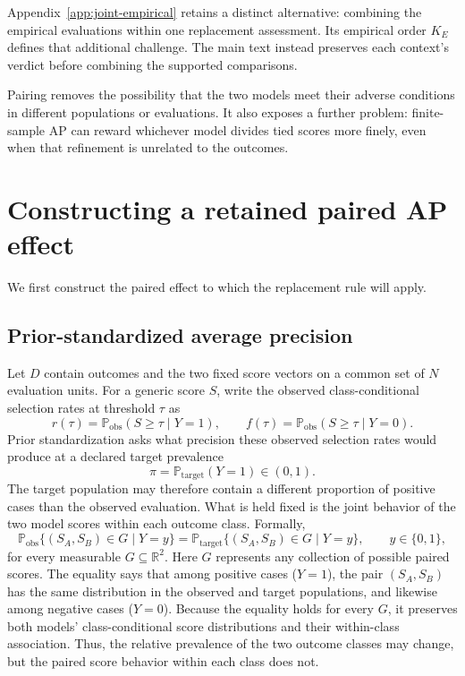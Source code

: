 \documentclass[11pt]{article}
\newcommand{\Prb}{\mathbb{P}}
\theoremstyle{remark}
\begin{document}
Appendix~\ref{app:joint-empirical} retains a distinct alternative: combining
the empirical evaluations within one replacement assessment. Its empirical
order $K_E$ defines that additional challenge. The main text instead preserves
each context's verdict before combining the supported comparisons.

Pairing removes the possibility that the two models meet their adverse
conditions in different populations or evaluations. It also exposes a further
problem: finite-sample AP can reward whichever model divides tied scores more
finely, even when that refinement is unrelated to the outcomes.

\section{Constructing a retained paired AP effect}
\label{sec:paired-effect}

We first construct the paired effect to which the replacement rule will apply.

\subsection{Prior-standardized average precision}

Let $D$ contain outcomes and the two fixed score vectors on a common set of
$N$ evaluation units. For a generic score $S$, write the observed
class-conditional selection rates at threshold $\tau$ as
\[
r(\tau)=\Prb_{\mathrm{obs}}(S\geq\tau\mid Y=1),
\qquad
f(\tau)=\Prb_{\mathrm{obs}}(S\geq\tau\mid Y=0).
\]
Prior standardization asks what precision these observed selection rates would
produce at a declared target prevalence
\[
\pi=\Prb_{\mathrm{target}}(Y=1)\in(0,1).
\]
The target population may therefore contain a different proportion of positive
cases than the observed evaluation. What is held fixed is the joint behavior
of the two model scores within each outcome class. Formally,
\begin{equation}
\Prb_{\mathrm{obs}}\{(S_A,S_B)\in G\mid Y=y\}
=
\Prb_{\mathrm{target}}\{(S_A,S_B)\in G\mid Y=y\},
\qquad y\in\{0,1\},
\label{eq:score-invariance}
\end{equation}
for every measurable $G\subseteq\mathbb R^2$. Here $G$ represents any
collection of possible paired scores. The equality says that among positive
cases ($Y=1$), the pair $(S_A,S_B)$ has the same distribution in the observed
and target populations, and likewise among negative cases ($Y=0$). Because the
equality holds for every $G$, it preserves both models' class-conditional score
distributions and their within-class association. Thus, the relative
prevalence of the two outcome classes may change, but the paired score behavior
within each class does not.
\end{document}
